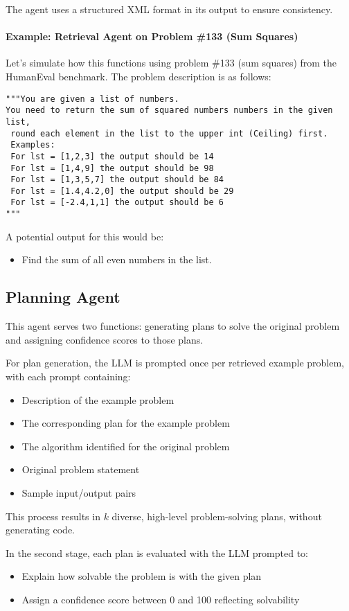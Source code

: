 \documentclass[11pt,a4paper]{article}
\begin{document}
The agent uses a structured XML format in its output to ensure consistency.

\paragraph{Example: Retrieval Agent on Problem \#133 (Sum Squares)}

Let’s simulate how this functions using problem \#133 (sum squares) from the HumanEval benchmark. The problem description is as follows:

\begin{verbatim}
"""You are given a list of numbers.
You need to return the sum of squared numbers numbers in the given list,
 round each element in the list to the upper int (Ceiling) first.
 Examples:
 For lst = [1,2,3] the output should be 14
 For lst = [1,4,9] the output should be 98
 For lst = [1,3,5,7] the output should be 84
 For lst = [1.4,4.2,0] the output should be 29
 For lst = [-2.4,1,1] the output should be 6
"""
\end{verbatim}

A potential output for this would be:
\begin{itemize}
  \item Find the sum of all even numbers in the list.
\end{itemize}

\subsection{Planning Agent}
This agent serves two functions: generating plans to solve the original problem and assigning confidence scores to those plans.

For plan generation, the LLM is prompted once per retrieved example problem, with each prompt containing:
\begin{itemize}
  \item Description of the example problem
  \item The corresponding plan for the example problem
  \item The algorithm identified for the original problem
  \item Original problem statement
  \item Sample input/output pairs
\end{itemize}

This process results in $k$ diverse, high-level problem-solving plans, without generating code.

In the second stage, each plan is evaluated with the LLM prompted to:
\begin{itemize}
  \item Explain how solvable the problem is with the given plan
  \item Assign a confidence score between 0 and 100 reflecting solvability
\end{itemize}
\end{document}
